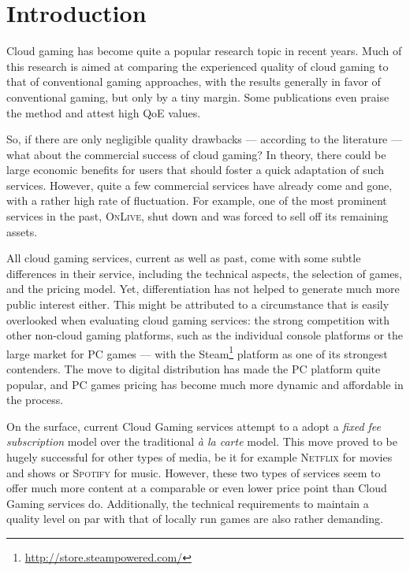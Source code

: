 

\section{Introduction}

Cloud gaming has become quite a popular research topic in recent years. 
Much of this research is aimed at comparing the experienced 
quality of cloud gaming to that of conventional gaming approaches, with 
the results
generally in favor of conventional gaming, but only by a 
tiny margin. Some publications even praise the method and attest high 
\gls{QoE} values.

So, if there are only negligible quality drawbacks --- according to the 
literature --- what about the commercial success of cloud gaming? In 
theory, there could be large economic benefits for users that should 
foster a quick adaptation of such services. 
However, quite a few commercial services have already come and gone, 
with a rather high rate of fluctuation. For example, one of the most 
prominent services in the past, \textsc{OnLive}, shut down and was forced to 
sell off its remaining assets.

All cloud gaming services, current as well 
as past, come with some subtle differences in their service, including 
the technical aspects, the selection of games, and the pricing 
model.
Yet, differentiation has not helped to generate much more public 
interest either. 
This might be attributed to a circumstance that is easily  
overlooked when evaluating cloud gaming services: the strong 
competition with other non-cloud gaming platforms, such as the 
individual console platforms or the large market for PC games --- with the 
Steam\footnote{\url{http://store.steampowered.com/}} platform as one of 
its strongest contenders. The move to digital distribution has made the 
PC platform quite popular, and PC games pricing has become 
much more dynamic and affordable in the process.

On the surface, current Cloud Gaming services attempt to a adopt a 
\textit{fixed fee subscription} model over the traditional 
\textit{à la carte} model. 
This move proved to be hugely successful for other types of media, be 
it for example \textsc{Netflix} for movies and shows or 
\textsc{Spotify} for music. However, these two types of services seem 
to offer much more content at a comparable or even lower price point 
than Cloud Gaming services do. Additionally, the technical requirements 
to maintain a quality level on par with that of locally run games are 
also rather demanding.

